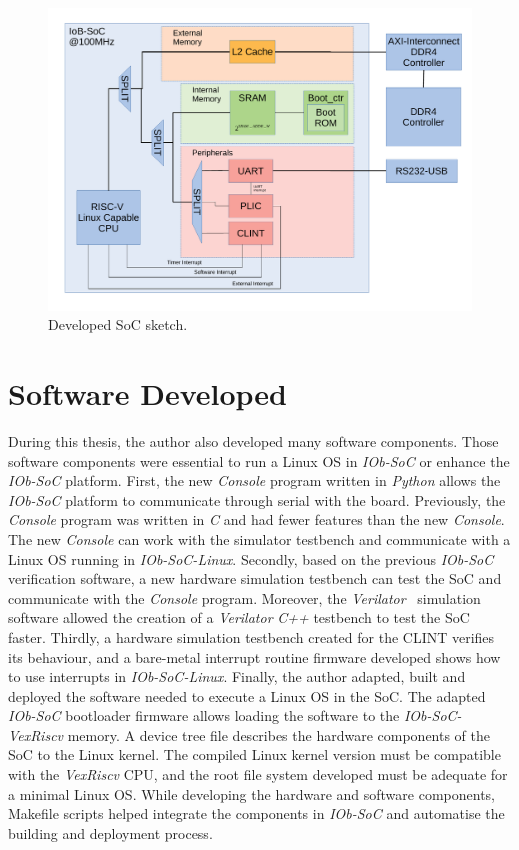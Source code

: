 \begin{figure}[!h]
    \centering
    \includegraphics[width=\linewidth]{../images/bd_linux.pdf}
    \caption{Developed SoC sketch.}
    \label{fig:bd_linux}
\end{figure}

\section{Software Developed}
\label{sec:software_developed}

During this thesis, the author also developed many software components. Those software components were essential to run a Linux OS in \textit{IOb-SoC} or enhance the \textit{IOb-SoC} platform. First, the new \textit{Console} program written in \textit{Python} allows the \textit{IOb-SoC} platform to communicate through serial with the board. Previously, the \textit{Console} program was written in \textit{C} and had fewer features than the new \textit{Console}. The new \textit{Console} can work with the simulator testbench and communicate with a Linux OS running in \textit{IOb-SoC-Linux}. Secondly, based on the previous \textit{IOb-SoC} verification software, a new hardware simulation testbench can test the SoC and communicate with the \textit{Console} program. Moreover, the \textit{Verilator}~\cite{snyder2010verilator} simulation software allowed the creation of a \textit{Verilator} \textit{C++} testbench to test the SoC faster. Thirdly, a hardware simulation testbench created for the CLINT verifies its behaviour, and a bare-metal interrupt routine firmware developed shows how to use interrupts in \textit{IOb-SoC-Linux}. Finally, the author adapted, built and deployed the software needed to execute a Linux OS in the SoC. The adapted \textit{IOb-SoC} bootloader firmware allows loading the software to the \textit{IOb-SoC-VexRiscv} memory. A device tree file describes the hardware components of the SoC to the Linux kernel. The compiled Linux kernel version must be compatible with the \textit{VexRiscv} CPU, and the root file system developed must be adequate for a minimal Linux OS. While developing the hardware and software components, Makefile scripts helped integrate the components in \textit{IOb-SoC} and automatise the building and deployment process.

